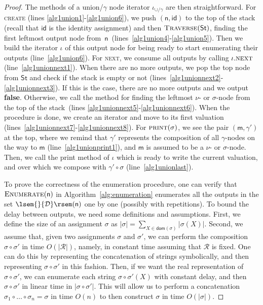 \documentclass[
a4paper
]{article}
\theoremstyle{plain}
\theoremstyle{definition}
\theoremstyle{remark}
\newcommand{\dom}{\operatorname{dom}}
\newcommand{\Reg}{\mathcal{R}}
\newcommand{\D}{\mathcal{D}}
\newcommand{\n}{\textsf{n}}
\newcommand{\m}{\textsf{m}}
\newcommand{\bnodelabel}{\m}
\newcommand{\uit}{\iota}
\newcommand{\uid}{\operatorname{id}}
\newcommand{\ustack}{\operatorname{St}}
\newcommand{\sem}[1]{{\lsem{}{#1}\rsem}}
\renewcommand{\operatorname}[1]{\textsf{#1}}
\begin{document}
\begin{proof}
	The methods of a union/$\gamma$ node iterator $\uit_{\cup/\gamma}$ are then straightforward. For \textsc{create} (lines \ref{alg1union1}-\ref{alg1union6}), we push $(\n,\uid)$ to the top of the stack (recall that $\uid$ is the identity assignment) and then  $\textproc{Traverse}(\ustack)$, finding the first leftmost output node from~$\n$~(lines~\ref{alg1union4}-\ref{alg1union5}). 
	Then we build the iterator $\uit$ of this output node for being ready to start enumerating their outputs (line~\ref{alg1union6}). 
	For \textsc{next}, we consume all outputs by calling $\uit.\textsc{next}$ (line~\ref{alg1unionnext1}). When there are no more outputs, we pop the top node from $\ustack$ and check if the stack is empty or not (lines~\ref{alg1unionnext2}-\ref{alg1unionnext3}). If this is the case, there are no more outputs and we output {\bf false}. Otherwise, we call the  method for finding the leftmost $\nu$- or $\sigma$-node from the top of the stack~(lines \ref{alg1unionnext5}-\ref{alg1unionnext6}). When the procedure is done, we create an iterator and move to its first valuation (lines~\ref{alg1unionnext7}-\ref{alg1unionnext8}). 
	For $\textsc{print}(\sigma)$, we see the pair $(\bnodelabel, \gamma')$ at the top, where we remind that $\gamma'$ represents the composition of all $\gamma$-nodes on the way to $\bnodelabel$ (line~\ref{alg1unionprint1}), and $\bnodelabel$ is assumed to be a $\nu$- or $\sigma$-node. Then, we call the print method of $\uit$ which is ready to write the current valuation, and over which we compose with  $\gamma' \circ \sigma$ (line~\ref{alg1unionlast}). 
	
	To prove the correctness of the enumeration procedure, one can verify that $\textsc{Enumerate}(\n)$ in Algorithm~\ref{alg:enumeration} enumerates all the outputs in the set $\sem{\D}(\n)$ one by one (possibly with repetitions). To bound the delay between outputs, we need some definitions and assumptions. First, we define the size of an assignment $\sigma$ as $|\sigma| = \sum_{X \in \dom(\sigma)} |\sigma(X)|$. Second, we assume that, given two assignments $\sigma$ and $\sigma'$, we can perform the composition $\sigma \circ \sigma'$ in time $O(|\Reg|)$, namely, in constant time assuming that $\Reg$ is fixed. One can do this by representing the concatenation of strings symbolically, and then representing $\sigma \circ \sigma'$ in this fashion. Then, if we want the real representation of $\sigma \circ \sigma'$, we can enumerate each string $\sigma \circ \sigma'(X)$ with constant delay, and then $\sigma \circ \sigma'$ in linear time in $|\sigma \circ \sigma'|$. This will allow us to perform a concatenation $\sigma_1 \circ  \ldots \circ \sigma_n = \sigma$ in time $O(n)$ to then construct $\sigma$ in time $O(|\sigma|)$. 
	

\end{proof}
\end{document}
